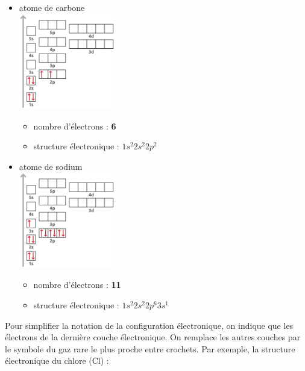 \documentclass[
  11pt,
  french,
  a4paper,
  openany]{book}
\providecommand{\tightlist}{%
  \setlength{\itemsep}{0pt}\setlength{\parskip}{0pt}}
\begin{document}
\begin{Answer}

\begin{itemize}
\tightlist
\item
  atome de carbone\\
  \includegraphics[width=0.33\textwidth,height=\textheight]{images/energy-level-2-2.png}

  \begin{itemize}
  \tightlist
  \item
    nombre d'électrons : \textbf{6}
  \item
    structure électronique : \(1s^2 2s^2 2p^2\)
  \end{itemize}
\item
  atome de sodium\\
  \includegraphics[width=0.33\textwidth,height=\textheight]{images/energy-level-2-3.png}

  \begin{itemize}
  \tightlist
  \item
    nombre d'électrons : \textbf{11}
  \item
    structure électronique : \(1s^2 2s^2 2p^6 3s^1\)
  \end{itemize}
\end{itemize}


\end{Answer}

Pour simplifier la notation de la configuration électronique, on indique que les électrons de la dernière couche électronique. On remplace les autres couches par le symbole du gaz rare le plus proche entre crochets. Par exemple, la structure électronique du chlore (Cl) :
\end{document}
